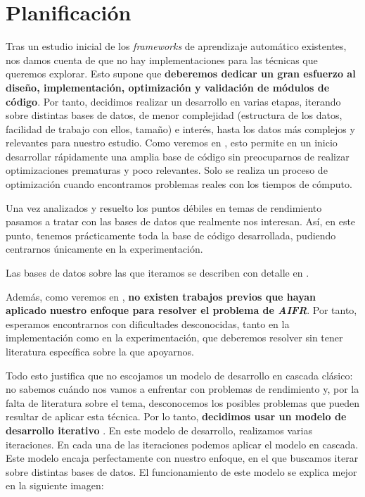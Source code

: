 \section{Planificación} \label{isec:planificacion}

Tras un estudio inicial de los \textit{frameworks} de aprendizaje automático existentes, nos damos cuenta de que no hay implementaciones para las técnicas que queremos explorar. Esto supone que \textbf{deberemos dedicar un gran esfuerzo al diseño, implementación, optimización y validación de módulos de código}. Por tanto, decidimos realizar un desarrollo en varias etapas, iterando sobre distintas bases de datos, de menor complejidad (estructura de los datos, facilidad de trabajo con ellos, tamaño) e interés, hasta los datos más complejos y relevantes para nuestro estudio. Como veremos en , esto permite en un inicio desarrollar rápidamente una amplia base de código sin preocuparnos de realizar optimizaciones prematuras y poco relevantes. Solo se realiza un proceso de optimización cuando encontramos problemas reales con los tiempos de cómputo.

Una vez analizados y resuelto los puntos débiles en temas de rendimiento pasamos a tratar con las bases de datos que realmente nos interesan. Así, en este punto, tenemos prácticamente toda la base de código desarrollada, pudiendo centrarnos únicamente en la experimentación.

Las bases de datos sobre las que iteramos se describen con detalle en .

Además, como veremos en , \textbf{no existen trabajos previos que hayan aplicado nuestro enfoque para resolver el problema de \textit{AIFR}}. Por tanto, esperamos encontrarnos con dificultades desconocidas, tanto en la implementación como en la experimentación, que deberemos resolver sin tener literatura específica sobre la que apoyarnos.

Todo esto justifica que no escojamos un modelo de desarrollo en cascada clásico: no sabemos cuándo nos vamos a enfrentar con problemas de rendimiento y, por la falta de literatura sobre el tema, desconocemos los posibles problemas que pueden resultar de aplicar esta técnica. Por lo tanto, \textbf{decidimos usar un modelo de desarrollo iterativo} \cite{informatica:libro_metodologias_desarrollo}. En este modelo de desarrollo, realizamos varias iteraciones. En cada una de las iteraciones podemos aplicar el modelo en cascada. Este modelo encaja perfectamente con nuestro enfoque, en el que buscamos iterar sobre distintas bases de datos. El funcionamiento de este modelo se explica mejor en la siguiente imagen:

